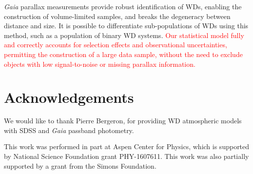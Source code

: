 \documentclass[fleqn,usenatbib]{mnras}
\newcommand{\changes}[1]{\textcolor{red}{#1}}
\begin{document}
\emph{Gaia} parallax measurements provide robust identification of WDs, enabling the construction of volume-limited samples, and breaks the degeneracy between distance and size. It is possible to differentiate sub-populations of WDs using this method, such as a population of binary WD systems. \changes{Our statistical model fully and correctly accounts for selection effects and observational uncertainties, permitting the construction of a large data sample, without the need to exclude objects with low signal-to-noise or missing parallax information.}



\section*{Acknowledgements}

We would like to thank Pierre Bergeron, for providing WD atmospheric models with SDSS and \emph{Gaia} passband photometry.

This work was performed in part at Aspen Center for Physics, which is supported by National Science Foundation grant PHY-1607611. This work was also partially supported by a grant from the Simons Foundation.











\bsp	%
\label{lastpage}
\end{document}
